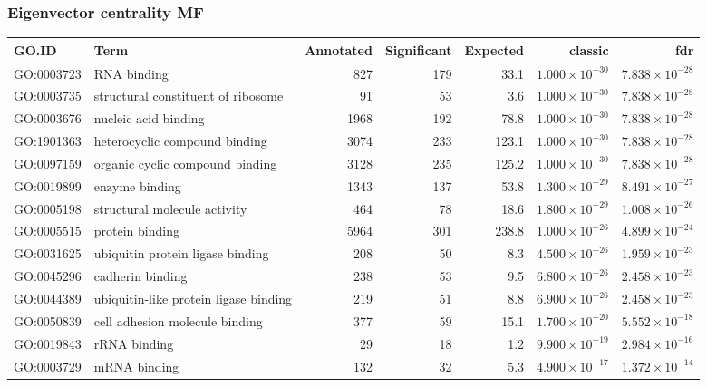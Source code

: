 \subsubsection{Eigenvector centrality MF}
\begin{table}[ht]
\centering
\begin{adjustbox}{width=\textwidth}
\begin{tabular}{llrrrrr}
  \hline
GO.ID & Term & Annotated & Significant & Expected & classic & fdr \\ 
  \hline
GO:0003723 & RNA binding & 827 & 179 & 33.1 & $1.000 \times 10^{-30}$ & $7.838 \times 10^{-28}$ \\ 
  GO:0003735 & structural constituent of ribosome & 91 & 53 & 3.6 & $1.000 \times 10^{-30}$ & $7.838 \times 10^{-28}$ \\ 
  GO:0003676 & nucleic acid binding & 1968 & 192 & 78.8 & $1.000 \times 10^{-30}$ & $7.838 \times 10^{-28}$ \\ 
  GO:1901363 & heterocyclic compound binding & 3074 & 233 & 123.1 & $1.000 \times 10^{-30}$ & $7.838 \times 10^{-28}$ \\ 
  GO:0097159 & organic cyclic compound binding & 3128 & 235 & 125.2 & $1.000 \times 10^{-30}$ & $7.838 \times 10^{-28}$ \\ 
  GO:0019899 & enzyme binding & 1343 & 137 & 53.8 & $1.300 \times 10^{-29}$ & $8.491 \times 10^{-27}$ \\ 
  GO:0005198 & structural molecule activity & 464 & 78 & 18.6 & $1.800 \times 10^{-29}$ & $1.008 \times 10^{-26}$ \\ 
  GO:0005515 & protein binding & 5964 & 301 & 238.8 & $1.000 \times 10^{-26}$ & $4.899 \times 10^{-24}$ \\ 
  GO:0031625 & ubiquitin protein ligase binding & 208 & 50 & 8.3 & $4.500 \times 10^{-26}$ & $1.959 \times 10^{-23}$ \\ 
  GO:0045296 & cadherin binding & 238 & 53 & 9.5 & $6.800 \times 10^{-26}$ & $2.458 \times 10^{-23}$ \\ 
  GO:0044389 & ubiquitin-like protein ligase binding & 219 & 51 & 8.8 & $6.900 \times 10^{-26}$ & $2.458 \times 10^{-23}$ \\ 
  GO:0050839 & cell adhesion molecule binding & 377 & 59 & 15.1 & $1.700 \times 10^{-20}$ & $5.552 \times 10^{-18}$ \\ 
  GO:0019843 & rRNA binding & 29 & 18 & 1.2 & $9.900 \times 10^{-19}$ & $2.984 \times 10^{-16}$ \\ 
  GO:0003729 & mRNA binding & 132 & 32 & 5.3 & $4.900 \times 10^{-17}$ & $1.372 \times 10^{-14}$ \\ 

\end{tabular}
\end{adjustbox}
\end{table}
